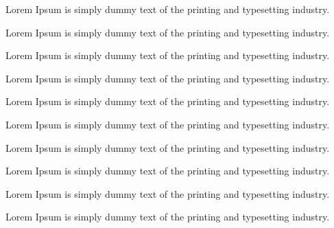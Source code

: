 \documentclass[
]{book}
\newenvironment{rmdTodo}{
	\vspace*{0.5\baselineskip}
    \par\noindent
    \begin{tcolorbox}[enhanced, title={\textbf{\color{white}To Do}},colback=MPIBlue!10!white, colframe=MPIBlue]
    \itshape
}{
    \end{tcolorbox}
    \par\ignorespacesafterend
}
\begin{document}
\begin{rmdTodo}
Lorem Ipsum is simply dummy text of the printing and typesetting industry.

\end{rmdTodo}

\begin{rmdtodo}
Lorem Ipsum is simply dummy text of the printing and typesetting industry.

\end{rmdtodo}

\begin{Theorem}{}{}
Lorem Ipsum is simply dummy text of the printing and typesetting industry.

\end{Theorem}

\begin{Definition}{}{}
Lorem Ipsum is simply dummy text of the printing and typesetting industry.

\end{Definition}

\begin{Lemma}{}{}
Lorem Ipsum is simply dummy text of the printing and typesetting industry.

\end{Lemma}

\begin{Corollary}{}{}
Lorem Ipsum is simply dummy text of the printing and typesetting industry.

\end{Corollary}

\begin{Proposition}{}{}
Lorem Ipsum is simply dummy text of the printing and typesetting industry.

\end{Proposition}

\begin{Exercise}{}{}
Lorem Ipsum is simply dummy text of the printing and typesetting industry.

\end{Exercise}

\begin{Example}{}{}
Lorem Ipsum is simply dummy text of the printing and typesetting industry.

\end{Example}

\begin{Remark}{}{}
Lorem Ipsum is simply dummy text of the printing and typesetting industry.

\end{Remark}
\end{document}
